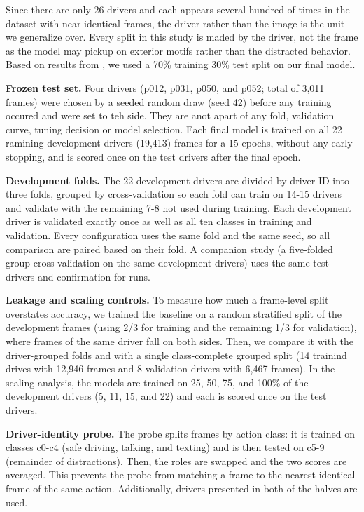 Since there are only 26 drivers and each appears several hundred of times in the dataset with near identical frames, the driver rather than the image is the unit we generalize over.
Every split in this study is maded by the driver, not the frame as the model may pickup on exterior motifs rather than the distracted behavior. 
Based on results from \cite{maDigitalTwin2024}, we used a 70\% training 30\% test split on our final model.

\textbf{Frozen test set. }
Four drivers (p012, p031, p050, and p052; total of 3,011 frames) were chosen by a seeded random draw (seed 42) before any training occured and were set to teh side.
They are anot apart of any fold, validation curve, tuning decision or model selection.
Each final model is trained on all 22 ramining development drivers (19,413) frames for a 15 epochs, without any early stopping, and is scored once on the test drivers after the final epoch.

\textbf{Development folds. }
The 22 development drivers are divided by driver ID into three folds, grouped by cross-validation so each fold can train on 14-15 drivers and validate with the remaining 7-8 not used during training. 
Each development driver is validated exactly once as well as all ten classes in training and validation.
Every configuration uses the same fold and the same seed, so all comparison are paired based on their fold.
A companion study (a five-folded group cross-validation on the same development drivers) uses the same test drivers and confirmation for runs.

\textbf{Leakage and scaling controls. }
To measure how much a frame-level split overstates accuracy, we trained the baseline on a random stratified split of the development frames (using 2/3 for training and the remaining 1/3 for validation), where frames of the same driver fall on both sides.
Then, we compare it with the driver-grouped folds and with a single class-complete grouped split (14 trainind drives with 12,946 frames and 8 validation drivers with 6,467 frames).
In the scaling analysis, the models are trained on 25, 50, 75, and 100\% of the development drivers (5, 11, 15, and 22) and each is scored once on the test drivers.

\textbf{Driver-identity probe. }
The probe splits frames by action class: it is trained on classes c0-c4 (safe driving, talking, and texting) and is then tested on c5-9 (remainder of distractions).
Then, the roles are swapped and the two scores are averaged.
This prevents the probe from matching a frame to the nearest identical frame of the same action.
Additionally, drivers presented in both of the halves are used.

